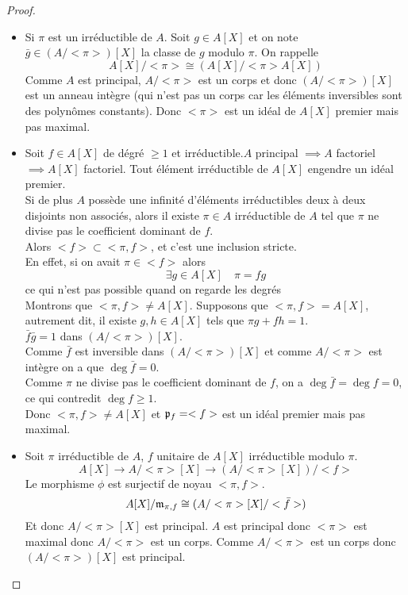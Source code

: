 \begin{proof}
	\begin{itemize}
		\item Si $\pi$ est un irréductible de $A$. Soit $g \in A[X]$ et on note $\bar{g} \in (A/<\pi>)[X]$ la classe de $g$ modulo $\pi$.
		      On rappelle
		      $$ A[X]/<\pi> \cong (A[X]/<\pi>A[X])$$
		      Comme $A$ est principal, $A/<\pi>$ est un corps et donc $(A/<\pi>)[X]$ est un anneau intègre (qui n'est pas un corps car les éléments
		      inversibles sont des polynômes constants). Donc $<\pi>$ est un idéal de $A[X]$ premier mais pas maximal.
		\item Soit $f \in A[X]$ de dégré $\geq 1$ et irréductible.$A$ principal $\implies A$ factoriel $\implies A[X]$ factoriel.
		      Tout élément irréductible de $A[X]$ engendre un idéal premier. \\
		      Si de plus $A$ possède une infinité d'éléments irréductibles deux à deux disjoints non associés, alors il existe $\pi \in A$ irréductible de $A$
		      tel que $\pi$ ne divise pas le coefficient dominant de $f$.\\
		      Alors $<f>  \subset <\pi,f>$, et c'est une inclusion stricte.\\
		      En effet, si on avait $\pi \in <f>$ alors
		      $$\exists g \in A[X]\quad \pi = fg$$ ce qui n'est pas possible quand on regarde les degrés \\
		      Montrons que $<\pi, f> \neq A[X]$.
		      Supposons que $<\pi, f> = A[X]$, autrement dit, il existe $g,h \in A[X]$ tels que $\pi g + fh = 1$.\\
		      $ \bar{f}\bar{g} = 1$ dans $(A/<\pi>)[X]$.\\
		      Comme $\bar{f}$ est inversible dans $(A/<\pi>)[X]$ et comme $A/<\pi>$ est intègre on a que $\deg \bar{f} = 0$.\\
		      Comme $\pi$ ne divise pas le coefficient dominant de $f$, on a $\deg \bar{f} = \deg f = 0$, ce qui contredit $\deg f \geq 1$.\\
		      Donc $<\pi, f> \neq A[X]$ et $\mathfrak{p}_f = <f>$ est un idéal premier mais pas maximal.
		\item  Soit $\pi$ irréductible de $A$, $f$ unitaire de $A[X]$ irréductible modulo $\pi$.\\
		      $$A[X] \to A/<\pi>[X] \to (A/<\pi>[X])/<f> $$ %
		      Le morphisme $\phi$ est surjectif de noyau $<\pi,f>$.
		      $$ A[X]/\mathfrak{m}_{\pi,f} \cong (A/<\pi>[X]/<\bar{f}>)$$
		      Et donc $A/<\pi>[X]$ est principal.
		      $A$ est principal donc $<\pi>$ est maximal donc $A/<\pi>$ est un corps. Comme $A/<\pi>$ est un corps donc $(A/<\pi>)[X]$ est principal.\\

\end{itemize}
\end{proof}
